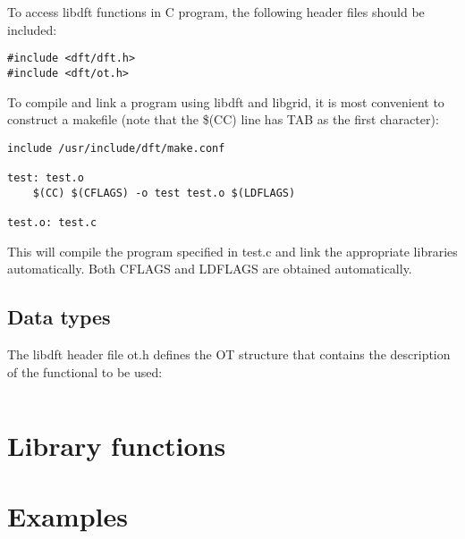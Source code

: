 \documentclass[12pt,letterpaper]{report}
\begin{document}
To access libdft functions in C program, the following header files should be 
included:
\begin{verbatim}
#include <dft/dft.h>
#include <dft/ot.h>
\end{verbatim}

To compile and link a program using libdft and libgrid, it is most convenient 
to construct a makefile (note that the \$(CC) line has TAB as the first 
character):
\begin{verbatim}
include /usr/include/dft/make.conf

test: test.o
    $(CC) $(CFLAGS) -o test test.o $(LDFLAGS)

test.o: test.c
\end{verbatim}
This will compile the program specified in test.c and link the appropriate 
libraries automatically. Both CFLAGS and LDFLAGS are obtained automatically. 

\section{Data types}

The libdft header file ot.h defines the OT structure that contains the description of the functional to be used:

\begin{verbatim}
\end{verbatim}

\chapter{Library functions}

\chapter{Examples}


\end{document}

